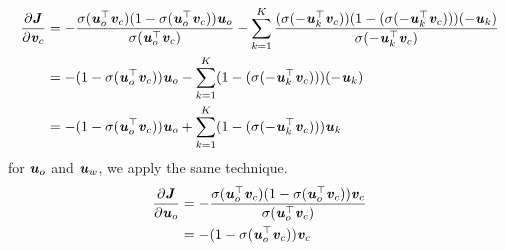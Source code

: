 \documentclass{article}
\begin{document}
\begin{equation*}
\begin{aligned}
    \frac {\partial \textbf{\textit{J}}} {\partial \textbf{\textit{v}}_c} &= - \frac {\sigma (\textbf{\textit{u}}_o^\top \textbf{\textit{v}}_c) (1 - \sigma (\textbf{\textit{u}}_o^\top \textbf{\textit{v}}_c)) \textbf{\textit{u}}_o} {\sigma (\textbf{\textit{u}}_o^\top \textbf{\textit{v}}_c)}  - \sum_{k=1}^{K} \frac{(\sigma (-\textbf{\textit{u}}_k^\top \textbf{\textit{v}}_c)) (1 - (\sigma (-\textbf{\textit{u}}_k^\top \textbf{\textit{v}}_c))) (-\textbf{\textit{u}}_k)}{\sigma (-\textbf{\textit{u}}_k^\top \textbf{\textit{v}}_c)}  \\
    &= - (1 - \sigma (\textbf{\textit{u}}_o^\top \textbf{\textit{v}}_c)) \textbf{\textit{u}}_o - \sum_{k=1}^{K} (1 - (\sigma (-\textbf{\textit{u}}_k^\top \textbf{\textit{v}}_c))) (-\textbf{\textit{u}}_k) \\
    &= - (1 - \sigma (\textbf{\textit{u}}_o^\top \textbf{\textit{v}}_c)) \textbf{\textit{u}}_o + \sum_{k=1}^{K} (1 - (\sigma (-\textbf{\textit{u}}_k^\top \textbf{\textit{v}}_c))) \textbf{\textit{u}}_k
\end{aligned}
\end{equation*}
for \(\textbf{\textit{u}}_o \) and \(\textbf{\textit{u}}_w\), we apply the same technique.
\begin{equation*}
\begin{aligned}
    \frac {\partial \textbf{\textit{J}}} {\partial \textbf{\textit{u}}_o} &= - \frac {\sigma (\textbf{\textit{u}}_o^\top \textbf{\textit{v}}_c) (1 - \sigma (\textbf{\textit{u}}_o^\top \textbf{\textit{v}}_c)) \textbf{\textit{v}}_c} {\sigma (\textbf{\textit{u}}_o^\top \textbf{\textit{v}}_c)} \\
    &= -(1 - \sigma (\textbf{\textit{u}}_o^\top \textbf{\textit{v}}_c)) \textbf{\textit{v}}_c
\end{aligned}
\end{equation*}
\end{document}
